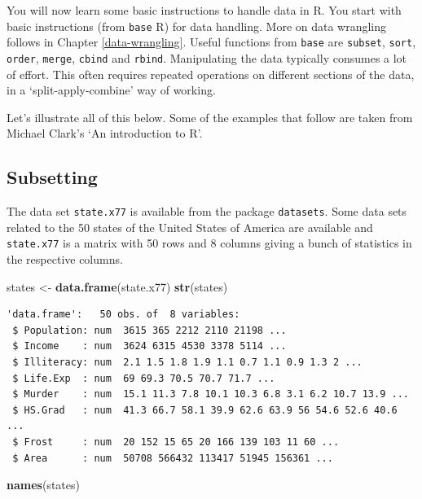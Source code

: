\documentclass[
]{book}
\newenvironment{Shaded}{\begin{snugshade}}{\end{snugshade}}
\newcommand{\KeywordTok}[1]{\textcolor[rgb]{0.13,0.29,0.53}{\textbf{#1}}}
\newcommand{\NormalTok}[1]{#1}
\newcommand{\StringTok}[1]{\textcolor[rgb]{0.31,0.60,0.02}{#1}}
\begin{document}
You will now learn some basic instructions to handle data in R. You start with basic instructions (from \texttt{base} R) for data handling. More on data wrangling follows in Chapter \ref{data-wrangling}. Useful functions from \texttt{base} are
\texttt{subset}, \texttt{sort}, \texttt{order}, \texttt{merge}, \texttt{cbind} and \texttt{rbind}. Manipulating the data typically consumes a lot of effort. This often requires repeated operations on different sections of the
data, in a `split-apply-combine' way of working.

Let's illustrate all of this below. Some of the examples that follow are taken from Michael Clark's `An introduction to R'.

\hypertarget{subsetting}{%
\subsection{Subsetting}\label{subsetting}}

The data set \texttt{state.x77} is available from the package \texttt{datasets}. Some data sets related to the 50 states of the United States of America are available and \texttt{state.x77} is a matrix with 50 rows and 8 columns giving a bunch of statistics in the respective columns.

\begin{Shaded}
\begin{Highlighting}[]
\NormalTok{states <-}\StringTok{ }\KeywordTok{data.frame}\NormalTok{(state.x77)}
\KeywordTok{str}\NormalTok{(states) }
\end{Highlighting}
\end{Shaded}

\begin{verbatim}
'data.frame':	50 obs. of  8 variables:
 $ Population: num  3615 365 2212 2110 21198 ...
 $ Income    : num  3624 6315 4530 3378 5114 ...
 $ Illiteracy: num  2.1 1.5 1.8 1.9 1.1 0.7 1.1 0.9 1.3 2 ...
 $ Life.Exp  : num  69 69.3 70.5 70.7 71.7 ...
 $ Murder    : num  15.1 11.3 7.8 10.1 10.3 6.8 3.1 6.2 10.7 13.9 ...
 $ HS.Grad   : num  41.3 66.7 58.1 39.9 62.6 63.9 56 54.6 52.6 40.6 ...
 $ Frost     : num  20 152 15 65 20 166 139 103 11 60 ...
 $ Area      : num  50708 566432 113417 51945 156361 ...
\end{verbatim}

\begin{Shaded}
\begin{Highlighting}[]
\KeywordTok{names}\NormalTok{(states)}
\end{Highlighting}
\end{Shaded}
\end{document}
